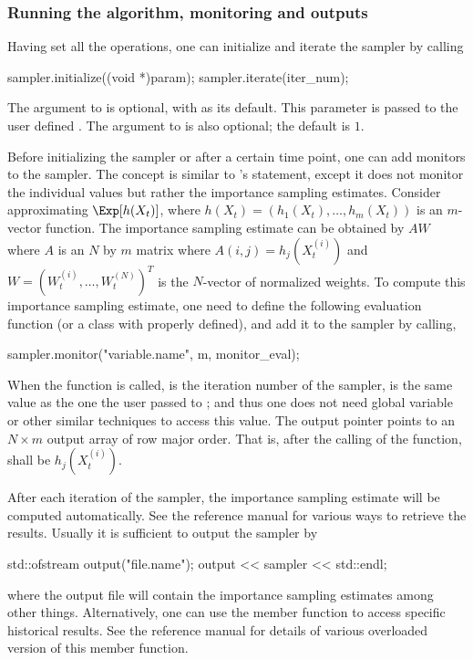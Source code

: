 \subsubsection{Running the algorithm, monitoring and outputs}
\label{ssub:Running the algorithm, monitoring and outputs}

Having set all the operations, one can initialize and iterate the sampler by
calling
\begin{cppcode}
sampler.initialize((void *)param);
sampler.iterate(iter_num);
\end{cppcode}
The  argument to  is optional, with
 as its default. This parameter is passed to the user defined
. The  argument to
 is also optional; the default is $1$.

Before initializing the sampler or after a certain time point, one can add
monitors to the sampler. The concept is similar to \bugs's 
statement, except it does not monitor the individual values but rather the
importance sampling estimates. Consider approximating $\Exp[h(X_t)]$, where
$h(X_t) = (h_1(X_t),\dots,h_m(X_t))$ is an $m$-vector function. The importance
sampling estimate can be obtained by $AW$ where $A$ is an $N$ by $m$ matrix
where $A(i,j) = h_j(X_t^{(i)})$ and $W = (W_t^{(i)},\dots,W_t^{(N)})^T$ is the
$N$-vector of normalized weights. To compute this importance sampling
estimate, one need to define the following evaluation function (or a class
with  properly defined),
and add it to the sampler by calling,
\begin{cppcode}
sampler.monitor("variable.name", m, monitor_eval);
\end{cppcode}
When the function  is called,  is the
iteration number of the sampler,  is the same value as the one
the user passed to ; and thus one does not need
global variable or other similar techniques to access this value. The output
pointer  points to an $N \times m$ output array of row major
order. That is, after the calling of the function,
 shall be $h_j(X_t^{(i)})$.

After each iteration of the sampler, the importance sampling estimate will be
computed automatically. See the reference manual for various ways to retrieve
the results. Usually it is sufficient to output the sampler by
\begin{cppcode}
std::ofstream output("file.name");
output << sampler << std::endl;
\end{cppcode}
where the output file will contain the importance sampling estimates among
other things. Alternatively, one can use the 
member function to access specific historical results. See the reference
manual for details of various overloaded version of this member function.

